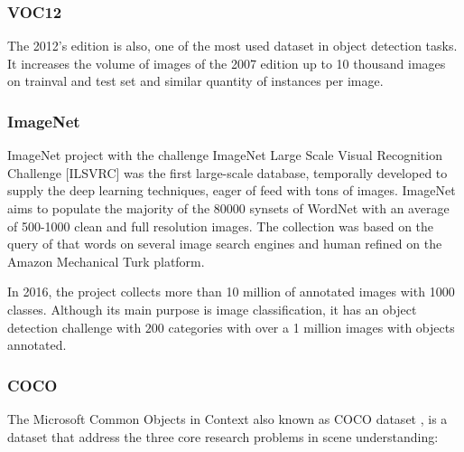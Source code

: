 \documentclass[12pt, a4paper, titlepage,twoside,openright]{article}
\begin{document}
\subsubsection{VOC12}

The 2012's edition is also, one of the most used dataset in object detection tasks. It increases the volume of images of the 2007 edition up to 10 thousand images on trainval and test set and similar quantity of instances per image. 


\subsubsection{ImageNet}



ImageNet project \cite{imagenet} with the challenge ImageNet Large Scale Visual Recognition Challenge [ILSVRC] was the first large-scale database, temporally developed to supply the deep learning techniques, eager of feed with tons of images. ImageNet aims to populate the majority of the 80000 synsets of WordNet with an average of 500-1000 clean and full resolution images. The collection was based on the query of that words on several image search engines and human refined on the Amazon Mechanical Turk platform.

In 2016, the project collects more than 10 million of annotated images with 1000 classes. Although its main purpose is image classification, it has an object detection challenge with $200$ categories with over a 1 million images with objects annotated.







\subsubsection{COCO}

The Microsoft Common Objects in Context also known as COCO dataset \cite{coco}, is a dataset that address the three core research problems in scene understanding:
\end{document}
